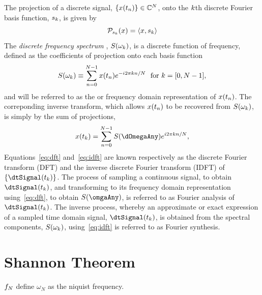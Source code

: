 The projection of a discrete signal, $\{ x(t_n) \} \in \mathbb{C}^{N} $, onto the $k$th discrete Fourier basis function, $s_k$, is given by
\begin{equation}
\mathcal{P}_{s_k} (x) = \left< x, s_k \right> \label{eq:projection-onto-basis}
\end{equation}
The \textit{ discrete frequency spectrum }, $S(\omega_{k})$, is a discrete function of frequency, defined as the coefficients of projection onto each basis function
\begin{equation}
  S(\omega_{k})
  \equiv \sum_{n=0}^{N-1} x(t_n) e^{-i 2 \pi k n / N }\ \ \textrm{for}\ k = [0,N - 1]
  \label{eq:dft}
  ,
\end{equation}
and will be referred to as the  or frequency domain representation of $x(t_n)$.
The correponding inverse transform, which allows $x(t_n)$ to be recovered from $S(\omega_{k})$, is simply by the sum of projections,
\begin{equation}
  x(\dtimeAny) = \DFTsum \Spectrum(\dOmegaAny) e^{i 2 \pi \dSinAnyIndex \nDFT / \Nsamples }
  \label{eq:idft} ,
\end{equation}
Equations~\eqref{eq:dft} and~\eqref{eq:idft} are known respectively as the discrete Fourier transform (DFT) and the inverse discrete Fourier transform (IDFT) of $\{ \dtSignal(\dtimeAny) \}$. The process of sampling a continuous signal, to obtain $\dtSignal(\dtimeAny)$, and transforming to its frequency domain representation using~\eqref{eq:dft}, to obtain $\Spectrum(\omgaAny)$, is referred to as Fourier analysis of $\dtSignal(\dtimeAny)$. The inverse process, whereby an approximate or exact expression of a sampled time domain signal, $\dtSignal(\dtimeAny)$, is obtained from the spectral components, $S(\omega_k)$, using~\eqref{eq:idft} is referred to as Fourier synthesis.



\section{Shannon Theorem}
$f_N$ define $\omega_N$ as the niquist frequency.

